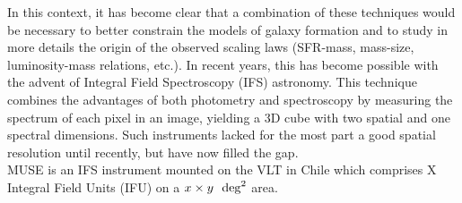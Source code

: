 In this context, it has become clear that a combination of these techniques would be necessary to better constrain the models of galaxy formation and to study in more details the origin of the observed scaling laws (SFR-mass, mass-size, luminosity-mass relations, etc.). In recent years, this has become possible with the advent of Integral Field Spectroscopy (IFS) astronomy. This technique combines the advantages of both photometry and spectroscopy by measuring the spectrum of each pixel in an image, yielding a 3D cube with two spatial and one spectral dimensions. Such instruments lacked for the most part a good spatial resolution until recently, but have now filled the gap. \\

MUSE is an IFS instrument mounted on the VLT in Chile which comprises X Integral Field Units (IFU) on a $x \times y \ \ \rm{deg}^2$ area. 
